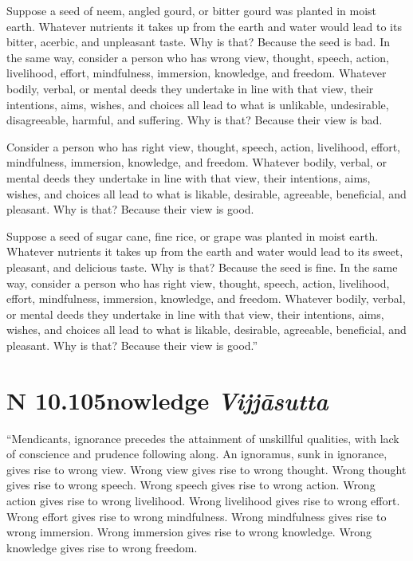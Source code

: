 \documentclass[12pt,openany]{book}%
\newcommand*{\suttatitleacronym}[1]{\smaller[2]{#1}\vspace*{.3em}}
\newcommand*{\suttatitletranslation}[1]{\linebreak{#1}}
\newcommand*{\suttatitleroot}[1]{\linebreak\smaller[2]\itshape{#1}}
\newcommand*{\tocacronym}[1]{\hspace*{-3.3em}{#1}\quad}
\newcommand*{\toctranslation}[1]{#1}
\newcommand*{\tocroot}[1]{(\textit{#1})}
\begin{document}
Suppose a seed of neem, angled gourd, or bitter gourd was planted in moist earth. Whatever nutrients it takes up from the earth and water would lead to its bitter, acerbic, and unpleasant taste. Why is that? Because the seed is bad. In the same way, consider a person who has wrong view, thought, speech, action, livelihood, effort, mindfulness, immersion, knowledge, and freedom. Whatever bodily, verbal, or mental deeds they undertake in line with that view, their intentions, aims, wishes, and choices all lead to what is unlikable, undesirable, disagreeable, harmful, and suffering. Why is that? Because their view is bad. 

Consider a person who has right view, thought, speech, action, livelihood, effort, mindfulness, immersion, knowledge, and freedom. Whatever bodily, verbal, or mental deeds they undertake in line with that view, their intentions, aims, wishes, and choices all lead to what is likable, desirable, agreeable, beneficial, and pleasant. Why is that? Because their view is good. 

Suppose a seed of sugar cane, fine rice, or grape was planted in moist earth. Whatever nutrients it takes up from the earth and water would lead to its sweet, pleasant, and delicious taste. Why is that? Because the seed is fine. In the same way, consider a person who has right view, thought, speech, action, livelihood, effort, mindfulness, immersion, knowledge, and freedom. Whatever bodily, verbal, or mental deeds they undertake in line with that view, their intentions, aims, wishes, and choices all lead to what is likable, desirable, agreeable, beneficial, and pleasant. Why is that? Because their view is good.” 

%
\section*{{\suttatitleacronym AN 10.105}{\suttatitletranslation Knowledge }{\suttatitleroot Vijjāsutta}}
\addcontentsline{toc}{section}{\tocacronym{AN 10.105} \toctranslation{Knowledge } \tocroot{Vijjāsutta}}

“Mendicants, ignorance precedes the attainment of unskillful qualities, with lack of conscience and prudence following along. An ignoramus, sunk in ignorance, gives rise to wrong view. Wrong view gives rise to wrong thought. Wrong thought gives rise to wrong speech. Wrong speech gives rise to wrong action. Wrong action gives rise to wrong livelihood. Wrong livelihood gives rise to wrong effort. Wrong effort gives rise to wrong mindfulness. Wrong mindfulness gives rise to wrong immersion. Wrong immersion gives rise to wrong knowledge. Wrong knowledge gives rise to wrong freedom. 
\end{document}
